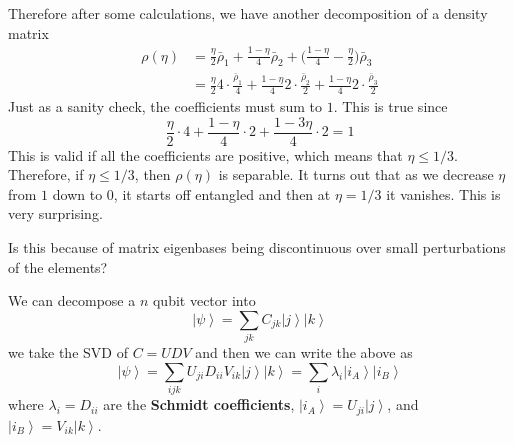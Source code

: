 \documentclass{article}
\newcommand{\ket}[1]{\ensuremath{\left|#1\right\rangle}}
\newcounter{question}[section]
\newcounter{definition}[section]
\begin{document}
  Therefore after some calculations, we have another decomposition of a density matrix 
  \begin{align}
    \rho(\eta) & = \frac{\eta}{2} \bar{\rho}_1 + \frac{1 - \eta}{4} \bar{\rho}_2 + \bigg( \frac{1 - \eta}{4} - \frac{\eta}{2} \bigg) \bar{\rho}_3 \\
               & = \frac{\eta}{2} 4 \cdot \frac{\bar{\rho}_1}{4} + \frac{1 - \eta}{4} 2 \cdot \frac{\bar{\rho}_2}{2} + \frac{1 - \eta}{4} 2 \cdot \frac{\bar{\rho}_3}{2} 
  \end{align}
  Just as a sanity check, the coefficients must sum to $1$. This is true since 
  \begin{equation}
    \frac{\eta}{2} \cdot 4 + \frac{1 - \eta}{4} \cdot 2 + \frac{1 - 3\eta}{4} \cdot 2 = 1 
  \end{equation}
  This is valid if all the coefficients are positive, which means that $\eta \leq 1/3$. Therefore, if $\eta \leq 1/3$, then $\rho(\eta)$ is separable. It turns out that as we decrease $\eta$ from $1$ down to $0$, it starts off entangled and then at $\eta = 1/3$ it vanishes. This is very surprising. 

  \begin{question}
    Is this because of matrix eigenbases being discontinuous over small perturbations of the elements? 
  \end{question}

  \begin{definition}
    \label{def:schmidt-decomposition}
    We can decompose a $n$ qubit vector into 
    \begin{equation}
      \ket{\psi} = \sum_{j k} C_{j k} \ket{j} \ket{k} 
    \end{equation}
    we take the SVD of $C = U D V$ and then we can write the above as 
    \begin{equation}
      \ket{\psi} = \sum_{i j k} U_{ji} D_{ii} V_{ik} \ket{j} \ket{k} = \sum_i \lambda_i \ket{i_A} \ket{i_B} 
    \end{equation}
    where $\lambda_i = D_{ii}$ are the \textbf{Schmidt coefficients}, $\ket{i_A} = U_{j i} \ket{j}$, and $\ket{i_B} = V_{ik} \ket{k}$. 
  \end{definition}
\end{document}
